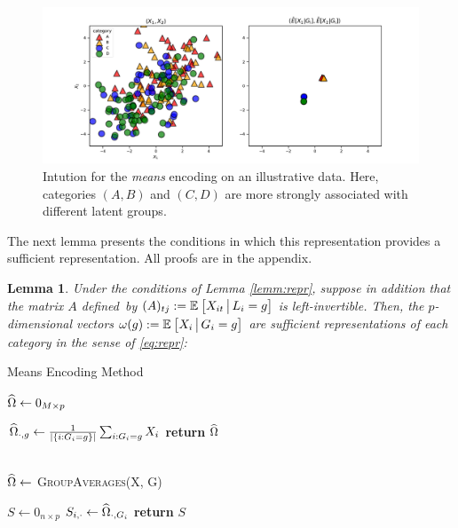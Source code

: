 \documentclass{article}
\theoremstyle{plain}
\newtheorem{lemm}[prop]{Lemma}
\theoremstyle{definition}
\theoremstyle{remark}
\begin{document}
\begin{figure}[H]
  \centering
  \includegraphics[width=\textwidth]{figures/means_intuition.pdf}
  \caption{Intution for the \emph{means} encoding on an illustrative data. Here, categories $(A,B)$ and $(C,D)$ are more strongly associated with different latent groups.}
  \label{fig:means_intuition}
\end{figure}


The next lemma presents the conditions in which this representation provides a sufficient representation. All proofs are in the appendix.

\begin{lemm}
\label{lemm:means}
Under the conditions of Lemma \ref{lemm:repr}, suppose in addition that the matrix $A$ defined~by $(A)_{tj} := \mathbb{E}_{}\left[X_{it} \,\big|\, L_{i} = g\right]$
is left-invertible. Then, the $p$-dimensional vectors $\omega(g) := \mathbb{E}_{}\left[X_{i} \,\big|\, G_i = g\right]$ are sufficient representations of each category in the sense of \eqref{eq:repr}:
\begin{equation}
\label{eq:explicit_mom}
\end{equation}
\end{lemm}


\begin{algorithm}
\label{alg:means}
\caption{Means Encoding Method}
\begin{algorithmic}[1]

  \State $\widehat{\Omega} \gets 0_{M \times p}$

  \vspace{0.09cm}
  \State $\widehat{\Omega}_{\cdot,g} \gets \frac{1}{|\{i:G_{i}=g\}|}\sum_{i:G_{i}=g}X_{i}$
  \EndFor
  \State \textbf{return} $\widehat{\Omega}$
  \EndProcedure

  \\

  \State $\widehat{\Omega} \gets$ \textsc{GroupAverages}(X, G)

  \State $S \gets 0_{n \times p}$
  \State $S_{i,\cdot} \gets \widehat{\Omega}_{\cdot,G_{i}}$
  \EndFor
  \State \textbf{return} $S$
  \EndProcedure

\end{algorithmic}
\end{algorithm}
\end{document}

